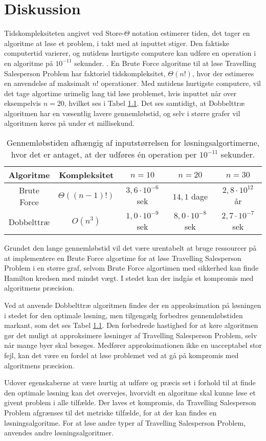 \chapter{Diskussion}

Tidskompleksiteten angivet ved Store-$\Theta$ notation estimerer tiden, det tager en algoritme at løse et problem, i takt med at inputtet stiger. 
Den faktiske computertid varierer, og nutidens hurtigste computere kan udføre en operation i en algoritme på $10^{-11}$ sekunder. \cite{dmat}.
En Brute Force algoritme til at løse Travelling Salesperson Problem har faktoriel tidskompleksitet, $\Theta(n!)$, hvor der estimeres en anvendelse af maksimalt $n!$ operationer.
Med nutidens hurtigste computere, vil det tage algortime urimelig lang tid løse problemet, hvis inputtet når over eksempelvis $n=20$, hvilket ses i Tabel \ref{tab_algtsp}. Det ses samtidigt, at Dobbelttræ algoritmen har en væsentlig lavere gennemløbstid, og selv i større grafer vil algoritmen køres på under et millisekund. 

\begin{table}[h]
 \centering
  \begin{tabular}{|c|c|c|c|c|}
   \hline
   Algoritme & Kompleksitet & $n=10$ & $n=20$ & $n=30$\\
   \hline
		Brute Force & $\Theta((n-1)!)$ & $3,6 \cdot 10^{-6}$ sek & $14,1$ dage & $2,8 \cdot 10^{12}$ år \\
   \hline
   Dobbelttræ & $O(n^3)$ & $1,0 \cdot 10^{-9}$ sek & $8,0 \cdot 10^{-8}$ sek & $2,7 \cdot 10^{-7}$ sek \\
   \hline
  \end{tabular}
 \caption{Gennemløbstiden afhængig af inputstørrelsen for løsningsalgortimerne, hvor det er antaget, at der udføres én operation per $10^{-11}$ sekunder.} \label{tab_algtsp}
\end{table}

Grundet den lange gennemløbstid vil det være urentabelt at bruge ressourcer på at implementere en Brute Force algortime for at løse Travelling Salesperson Problem i en større graf, selvom Brute Force algortimen med sikkerhed kan finde Hamilton kredsen med mindst vægt. 
I stedet kan der indgås et kompromis med algoritmens præcision. 

Ved at anvende Dobbelttræ algoritmen findes der en approksimation på løsningen i stedet for den optimale løsning, men tilgengælg forbedres gennemløbstiden markant, som det ses Tabel \ref{tab_algtsp}. 
Den forbedrede hastighed for at køre algoritmen gør det muligt at approksimere løsninger af Travelling Salesperson Problem, selv når mange byer skal besøges. 
Medfører approksimationen ikke en uacceptabel stor fejl, kan det være en  fordel at løse problemet ved at gå på kompromis med algoritmens præcision.

Udover egenskaberne at være hurtig at udføre og præcis set i forhold til at finde den optimale løsning kan det overvejes, hvorvidt en algoritme skal kunne løse et givent problem i alle tilfælde. 
Der laves et kompromis, da Travelling Salesperson Problem afgrænses til det metriske tilfælde, for at der kan findes en løsningsalgoritme. For at løse andre typer af Travelling Salesperson Problem, anvendes andre løsningsalgoritmer. 
